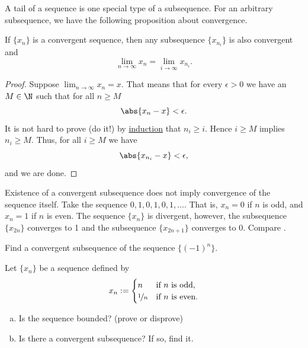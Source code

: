\documentclass[12pt]{book}
\begin{document}
A tail of a sequence is one special type of a subsequence.
For an arbitrary
subsequence, we have the following proposition about convergence.

\begin{prop} \label{prop:seqtosubseq}
If $\{ x_n \}$ is a convergent sequence,
then any subsequence $\{ x_{n_i} \}$ is also convergent and
\begin{equation*}
\lim_{n\to \infty} x_n = 
\lim_{i\to \infty} x_{n_i} .
\end{equation*}
\end{prop}

\begin{proof}
Suppose $\lim_{n\to \infty} x_n = x$.
That means that for every
$\epsilon > 0$ we have an $M \in \N$ such that for all $n \geq M$
\begin{equation*}
\abs{x_n - x} < \epsilon .
\end{equation*}
It is not hard to prove (do it!) by \hyperref[induction:thm]{induction} that
$n_i \geq i$.
Hence $i \geq M$ implies $n_i \geq M$.
Thus,
for all $i \geq M$ we have
\begin{equation*}
\abs{x_{n_i} - x} < \epsilon ,
\end{equation*}
and we are done.
\end{proof}

\begin{example}
Existence of a convergent subsequence does not imply
convergence of the sequence itself.
Take the sequence $0,1,0,1,0,1,\ldots$.
That is,
$x_n = 0$ if $n$ is odd, and $x_n = 1$ if $n$ is even.
The sequence
$\{ x_n \}$ is divergent, however, the subsequence
$\{ x_{2n} \}$ converges to 1 and the subsequence
$\{ x_{2n+1} \}$ converges to 0.
Compare .
\end{example}

\begin{exercise}
Find a convergent subsequence of the sequence
$\{ {(-1)}^n \}$.
\end{exercise}

\begin{exercise}
Let $\{x_n\}$ be a sequence defined by
\begin{equation*}
x_n := 
\begin{cases}
n & \text{if $n$ is odd} , \\
\nicefrac{1}{n} & \text{if $n$ is even} .
\end{cases}
\end{equation*}
\begin{enumerate}[a)]
\item Is the sequence bounded? (prove or disprove)
\item Is there a convergent subsequence?
  If so, find it.
\end{enumerate}
\end{exercise}
\end{document}

